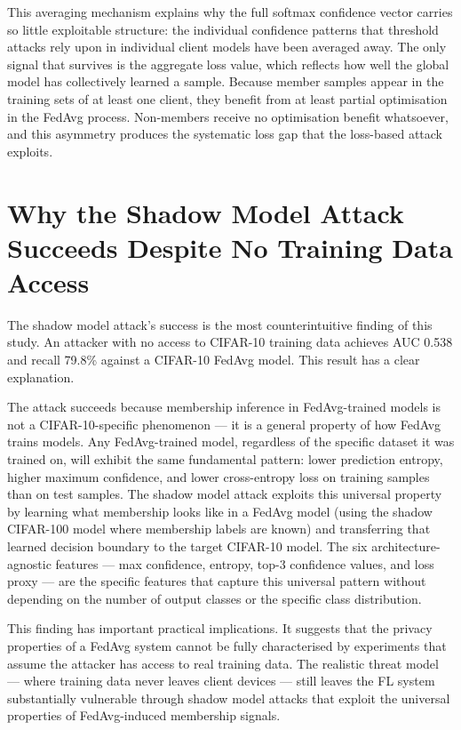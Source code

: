 \documentclass[12pt, a4paper]{report}
\begin{document}
This averaging mechanism explains why the full softmax confidence vector carries
so little exploitable structure: the individual confidence patterns that threshold
attacks rely upon in individual client models have been averaged away. The only signal that survives is the aggregate loss value, which reflects
how well the global model has collectively learned a sample. Because member samples
appear in the training sets of at least one client, they benefit from at least
partial optimisation in the FedAvg process. Non-members receive no optimisation
benefit whatsoever, and this asymmetry produces the systematic loss gap that the
loss-based attack exploits.

\section{Why the Shadow Model Attack Succeeds Despite No Training Data Access}

The shadow model attack's success is the most counterintuitive finding of this
study. An attacker with no access to CIFAR-10 training data achieves AUC 0.538
and recall 79.8\% against a CIFAR-10 FedAvg model. This result has a clear
explanation.

The attack succeeds because membership inference in FedAvg-trained models is
not a CIFAR-10-specific phenomenon --- it is a general property of how FedAvg
trains models. Any FedAvg-trained model, regardless of the specific dataset it
was trained on, will exhibit the same fundamental pattern: lower prediction
entropy, higher maximum confidence, and lower cross-entropy loss on training
samples than on test samples. The shadow model attack exploits this universal
property by learning what membership looks like in a FedAvg model (using the
shadow CIFAR-100 model where membership labels are known) and transferring that
learned decision boundary to the target CIFAR-10 model. The six architecture-
agnostic features --- max confidence, entropy, top-3 confidence values, and loss
proxy --- are the specific features that capture this universal pattern without
depending on the number of output classes or the specific class distribution.

This finding has important practical implications. It suggests that the privacy
properties of a FedAvg system cannot be fully characterised by experiments that
assume the attacker has access to real training data. The realistic threat model
--- where training data never leaves client devices --- still leaves the FL
system substantially vulnerable through shadow model attacks that exploit the
universal properties of FedAvg-induced membership signals.
\end{document}
